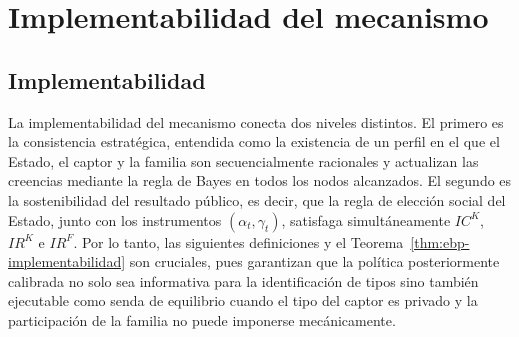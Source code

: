 \documentclass[pdflatex,sn-mathphys-ay]{sn-jnl}
\theoremstyle{thmstyleone}
\theoremstyle{thmstyletwo}
\theoremstyle{thmstylethree}
\newcommand{\1}{\mathbf{1}}
\begin{document}
\section{Implementabilidad del mecanismo}\label{sec:implementabilidad}

\subsection{Implementabilidad}\label{subsec:implementabilidad}

\noindent La implementabilidad del mecanismo conecta dos niveles distintos. El primero es la consistencia estratégica, entendida como la existencia de un perfil en el que el Estado, el captor y la familia son secuencialmente racionales y actualizan las creencias mediante la regla de Bayes en todos los nodos alcanzados. El segundo es la sostenibilidad del resultado público, es decir, que la regla de elección social del Estado, junto con los instrumentos $(\alpha_t,\gamma_t)$, satisfaga simultáneamente $IC^K$, $IR^K$ e $IR^F$. Por lo tanto, las siguientes definiciones y el Teorema~\ref{thm:ebp-implementabilidad} son cruciales, pues garantizan que la política posteriormente calibrada no solo sea informativa para la identificación de tipos sino también ejecutable como senda de equilibrio cuando el tipo del captor es privado y la participación de la familia no puede imponerse mecánicamente.
\end{document}
